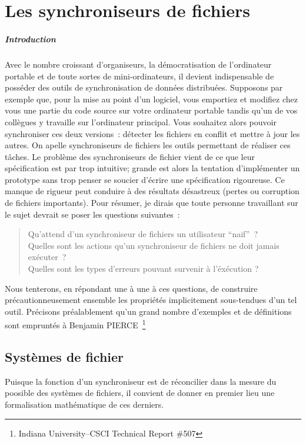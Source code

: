 \documentclass[11pt]{report}
\newcommand{\adv}{Benjamin PIERCE}
\begin{document}
        \chapter{Les synchroniseurs de fichiers}
\paragraph{Introduction\\}
Avec le nombre croissant d'organiseurs, la d\'emocratisation de l'ordinateur
portable et de toute sortes de mini-ordinateurs, il devient 
indispensable de poss\'eder des outils de synchronisation de 
donn\'ees distribu\'ees. Supposons par exemple que, pour la mise au point 
d'un logiciel, vous emportiez et modifiez chez vous une partie du code 
source sur votre ordinateur portable tandis qu'un de vos coll\`egues 
y travaille sur l'ordinateur principal. Vous souhaitez alors pouvoir
synchroniser ces deux versions~: d\'etecter les fichiers en conflit et 
mettre \`a jour les autres.
On apelle synchroniseurs de fichiers les outils permettant de r\'ealiser ces
t\^aches.
Le probl\`eme des synchroniseurs de fichier vient de ce que leur 
sp\'ecification est par trop intuitive; grande est alors la tentation
d'impl\'ementer un prototype sans trop penser se soucier d'\'ecrire une 
sp\'ecification rigoureuse. Ce manque de rigueur peut conduire \`a des 
r\'esultats d\'esastreux (pertes ou corruption de fichiers importants).
Pour r\'esumer, je dirais que toute personne travaillant sur le sujet 
devrait se poser les questions suivantes~:
\begin{quote}
Qu'attend d'un synchroniseur de fichiers un utilisateur ``naif''~?\\
Quelles sont les actions qu'un synchroniseur de fichiers ne doit jamais 
ex\'ecuter~?\\
Quelles sont les types d'erreurs pouvant survenir \`a l'\'ex\'ecution ?
\end{quote}
Nous tenterons, en r\'epondant une \`a une \`a ces questions, de construire
pr\'ecautionneusement ensemble les propri\'et\'es implicitement sous-tendues
d'un tel outil. Pr\'ecisons pr\'ealablement qu'un grand nombre d'exemples et 
de d\'efinitions sont emprunt\'es \`a \adv\ \footnote{Indiana University--CSCI Technical Report \#507}
        \section{Syst\`emes de fichier}
Puisque la fonction d'un synchroniseur est de r\'econcilier dans la mesure du
poosible des syst\`emes de fichiers, il convient de donner en premier lieu
une formalisation math\'ematique de ces derniers.
\end{document}
